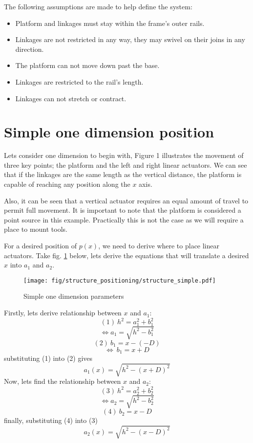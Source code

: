 \documentclass[a4paper, 11pt, twoside]{Thesis}  %
\begin{document}
The following assumptions are made to help define the system:
\begin{itemize}
\item  Platform and linkages must stay within the frame's outer rails.
\item  Linkages are not restricted in any way, they may swivel on their joins in any direction.
\item  The platform can not move down past the base.
\item  Linkages are restricted to the rail's length.
\item  Linkages can not stretch or contract.
\end{itemize}
\section{Simple one dimension position}

Lets consider one dimension to begin with, Figure 1 illustrates the movement of three key points; the platform and the left and right linear actuators. We can see that if the linkages are the same length as the vertical distance, the platform is capable of reaching any position along the $x$ axis.



Also, it can be seen that a vertical actuator requires an equal amount of travel to permit full movement. It is important to note that the platform is considered a point source in this example. Practically this is not the case as we will require a place to mount tools.

For a desired position of $p(x)$, we need to derive where to place linear actuators. Take fig. \ref{fig:structure_simple.svg} below, lets derive the equations that will translate a desired $x$ into $a_1$ and $a_2$. 

\begin{figure}[H]
\centering%
\texttt{[image: fig/structure\_positioning/structure\_simple.pdf]}
\caption{Simple one dimension parameters}
\label{fig:structure_simple.svg}
\end{figure}

Firstly, lets derive relationship between $x$ and $a_1$:
$$ (1)\  h^2 = a^{2}_{1} + b^{2}_{1} $$
$$  \Leftrightarrow  a_{1} = \sqrt{ h^2 - b^{2}_{1} }$$
$$ (2)\  b_1 = x - (-D)$$
$$ \Leftrightarrow\  b_1 = x + D$$
substituting (1) into (2) gives
$$ a_1(x) = \sqrt{ h^2 - ( x + D )^2 }$$
Now, lets find the relationship between $x$ and $a_2$:
$$ (3)\  h^2 = a^{2}_{2} + b^{2}_{2}$$
$$  \Leftrightarrow  a_{2} = \sqrt{ h^2 - b^{2}_{2} }$$
$$ (4)\  b_2 = x - D$$
finally, substituting (4) into (3)
$$ a_2(x) = \sqrt{ h^2 - (x - D)^2 } $$
\end{document}
